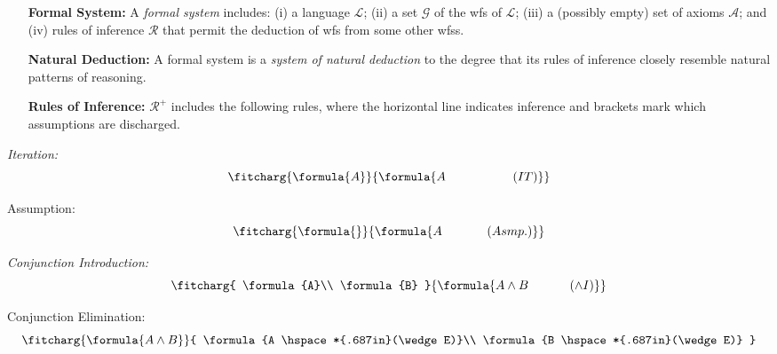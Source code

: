 \documentclass[a4paper, 11pt]{article} %
\begin{document}
\begin{enumerate}[leftmargin=1.2in,labelsep=.15in] %
\item[\bf Formal System:] A \textit{formal system} includes: (i) a language $\mathcal{L}$; (ii) a set $\mathcal{G}$ of the wfs of $\mathcal{L}$; (iii) a (possibly empty) set of axioms $\mathcal{A}$; and (iv) rules of inference $\mathcal{R}$ that permit the deduction of wfs from some other wfss.
\item[\bf Natural Deduction:] A formal system is a \textit{system of natural deduction} to the degree that its rules of inference closely resemble natural patterns of reasoning.%
\item[\bf Rules of Inference:] $\mathcal{R}^+$ includes the following rules, where the horizontal line indicates inference and brackets mark which assumptions are discharged.
\end{enumerate}



\begin{multicols}{2}\it
Iteration:
\begin{equation*}
\fitcharg{
\formula{A}
}{
\formula{A \hspace*{.75in}(IT)}
}
\end{equation*}

Assumption:
\begin{equation*}
\fitcharg{
\formula{}
}{
\formula{A \hspace*{.5in}(Asmp.)}
}
\end{equation*}
\end{multicols}
\vspace{-.05in}


\begin{multicols}{2}\it
Conjunction Introduction:\vspace{-.05in}
\begin{equation*}
\fitcharg{
\formula{A}\\
\formula{B}
}{
\formula{A\wedge B \hspace*{.46in}(\wedge I)}
}
\end{equation*}

Conjunction Elimination:\vspace{-.05in}
\begin{equation*}
\fitcharg{
\formula{A\wedge B}
}{
\formula{A \hspace*{.687in}(\wedge E)}\\
\formula{B \hspace*{.687in}(\wedge E)}
}
\end{equation*}
\end{multicols}
\vspace{-.05in}
\end{document}
